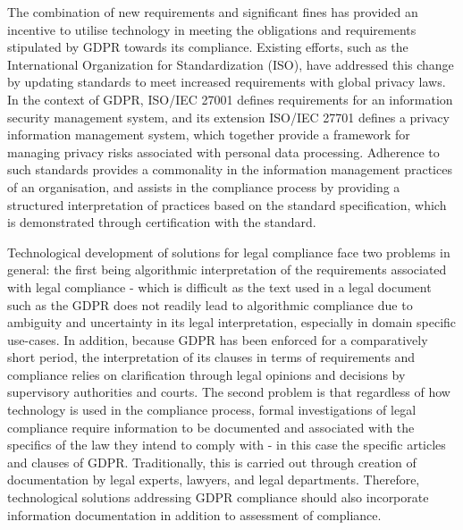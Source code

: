 The combination of new requirements and significant fines has provided an incentive to utilise technology in meeting the obligations and requirements stipulated by GDPR towards its compliance.
Existing efforts, such as the International Organization for Standardization (ISO), have addressed this change by updating standards to meet increased requirements with global privacy laws.
In the context of GDPR, ISO/IEC 27001 defines requirements for an information security management system, and its extension ISO/IEC 27701 defines a privacy information management system, which together provide a framework for managing privacy risks associated with personal data processing.
Adherence to such standards provides a commonality in the information management practices of an organisation, and assists in the compliance process by providing a structured interpretation of practices based on the standard specification, which is demonstrated through certification with the standard.

Technological development of solutions for legal compliance face two problems in general: the first being algorithmic interpretation of the requirements associated with legal compliance - which is difficult as the text used in a legal document such as the GDPR does not readily lead to algorithmic compliance due to ambiguity and uncertainty in its legal interpretation, especially in domain specific use-cases.
In addition, because GDPR has been enforced for a comparatively short period, the interpretation of its clauses in terms of requirements and compliance relies on clarification through legal opinions and decisions by supervisory authorities and courts.
The second problem is that regardless of how technology is used in the compliance process, formal investigations of legal compliance require information to be documented and associated with the specifics of the law they intend to comply with - in this case the specific articles and clauses of GDPR.
Traditionally, this is carried out through creation of documentation by legal experts, lawyers, and legal departments.
Therefore, technological solutions addressing GDPR compliance should also incorporate information documentation in addition to assessment of compliance. 

